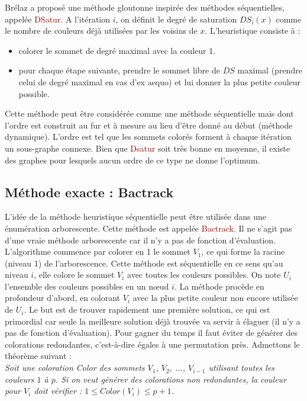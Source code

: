 \documentclass{article}
\newcommand{\red}[1]{\textcolor{darkred}{#1}}
\begin{document}
Brélaz a proposé une méthode gloutonne inspirée des méthodes séquentielles, appelée \red{DSatur}. A l’itération $i$, on définit le degré de saturation $DS_i(x)$ comme le nombre 
de couleurs déjà utilisées par les voisins de $x$. L’heuristique consiste à :
\begin{itemize}
\item colorer le sommet de degré maximal avec la couleur 1.
\item pour chaque étape suivante, prendre le sommet libre de $DS$ maximal (prendre celui de degré maximal en cas d’ex aequo) et lui donner la plus petite couleur possible.
\end{itemize}
Cette méthode peut être considérée comme une méthode séquentielle mais dont l’ordre est construit au fur et à mesure au lieu d’être donné au début (méthode dynamique). L’ordre 
est tel que les sommets colorés forment à chaque itération un sous-graphe connexe. Bien que \red{Dsatur} soit très bonne en moyenne, il existe des graphes pour lesquels aucun 
ordre de ce type ne donne l’optimum.

\subsection{Méthode exacte : Bactrack}

L’idée de la méthode heuristique séquentielle peut être utilisée dans une énumération arborescente. Cette méthode est appelée \red{Bactrack}. Il ne s’agit pas d’une vraie méthode 
arborescente car il n’y a pas de fonction d’évaluation. L’algorithme commence par colorer en 1 le sommet $V_1$, ce qui forme la racine (niveau 1) de l’arborescence. Cette méthode 
est séquentielle en ce sens qu’au niveau $i$, elle colore le sommet $V_i$ avec toutes les couleurs possibles. On note $U_i$ l’ensemble des couleurs possibles en un nœud $i$. La 
méthode procède en profondeur d’abord, en colorant $V_i$ avec la plus petite couleur non encore utilisée de $U_i$. Le but est de trouver rapidement une première solution, ce qui 
est primordial car seule la meilleure solution déjà trouvée va servir à élaguer (il n’y a pas de fonction d’évaluation). Pour gagner du temps il faut éviter de générer des colorations
redondantes, c’est-à-dire égales à une permutation près. Admettons le théorème suivant : \\

\textit{Soit une coloration Color des sommets $V_1$, $V_2$, ..., $V_{i-1}$ utilisant toutes les couleurs $1$ à $p$. Si on veut générer des colorations non redondantes, la couleur 
pour $V_i$ doit vérifier : $1 \leq Color(V_i) \leq p+1$.} \\
\end{document}
